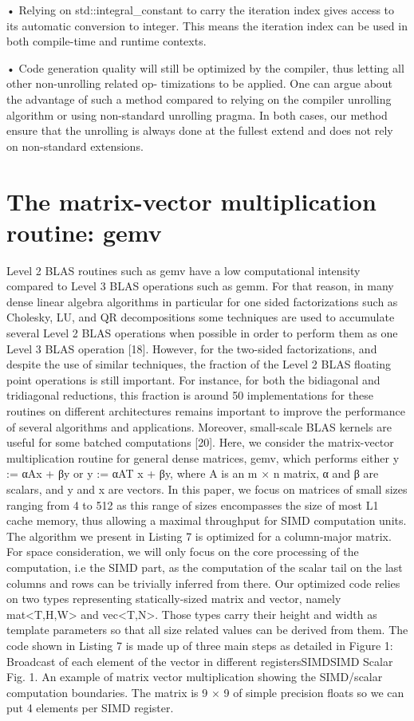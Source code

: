 \documentclass[../../main.tex]{subfiles}
\begin{document}
• Relying on std::integral_constant to carry the
iteration index gives access to its automatic conversion
to integer. This means the iteration index can be used in
both compile-time and runtime contexts.

• Code generation quality will still be optimized by the
compiler, thus letting all other non-unrolling related op-
timizations to be applied.
One can argue about the advantage of such a method
compared to relying on the compiler unrolling algorithm
or using non-standard unrolling pragma. In both cases, our
method ensure that the unrolling is always done at the fullest
extend and does not rely on non-standard extensions.

\section{The matrix-vector multiplication routine: gemv}

Level 2 BLAS routines such as gemv have a low
computational intensity compared to Level 3 BLAS operations
such as gemm. For that reason, in many dense linear algebra
algorithms in particular for one sided factorizations such as
Cholesky, LU, and QR decompositions some techniques are
used to accumulate several Level 2 BLAS operations when
possible in order to perform them as one Level 3 BLAS
operation [18]. However, for the two-sided factorizations,
and despite the use of similar techniques, the fraction of the
Level 2 BLAS floating point operations is still important. For
instance, for both the bidiagonal and tridiagonal reductions,
this fraction is around 50%
implementations for these routines on different architectures
remains important to improve the performance of several
algorithms and applications. Moreover, small-scale BLAS
kernels are useful for some batched computations [20].
Here, we consider the matrix-vector multiplication routine
for general dense matrices, gemv, which performs either
y := αAx + βy or y := αAT x + βy, where A is an m × n
matrix, α and β are scalars, and y and x are vectors. In
this paper, we focus on matrices of small sizes ranging from
4 to 512 as this range of sizes encompasses the size of
most L1 cache memory, thus allowing a maximal throughput
for SIMD computation units. The algorithm we present in
Listing 7 is optimized for a column-major matrix. For space
consideration, we will only focus on the core processing of
the computation, i.e the SIMD part, as the computation of
the scalar tail on the last columns and rows can be trivially
inferred from there.
Our optimized code relies on two types representing
statically-sized matrix and vector, namely mat<T,H,W>
and vec<T,N>. Those types carry their height and width
as template parameters so that all size related values can be
derived from them. The code shown in Listing 7 is made up
of three main steps as detailed in Figure 1:
Broadcast of each element of
the vector in different registersSIMDSIMD Scalar
Fig. 1. An example of matrix vector multiplication showing the SIMD/scalar
computation boundaries. The matrix is 9 × 9 of simple precision floats so we
can put 4 elements per SIMD register.
\end{document}
